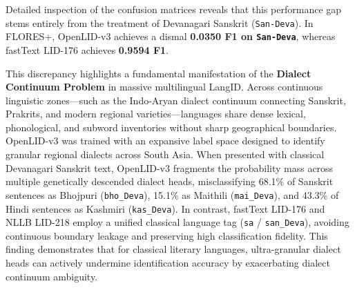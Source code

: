 \documentclass[11pt]{article}
\begin{document}
Detailed inspection of the confusion matrices reveals that this performance gap stems entirely from the treatment of Devanagari Sanskrit (\texttt{San-Deva}). In FLORES+, OpenLID-v3 achieves a dismal \textbf{0.0350 F1 on \texttt{San-Deva}}, whereas fastText LID-176 achieves \textbf{0.9594 F1}.

This discrepancy highlights a fundamental manifestation of the \textbf{Dialect Continuum Problem} in massive multilingual LangID. Across continuous linguistic zones—such as the Indo-Aryan dialect continuum connecting Sanskrit, Prakrits, and modern regional varieties—languages share dense lexical, phonological, and subword inventories without sharp geographical boundaries. OpenLID-v3 was trained with an expansive label space designed to identify granular regional dialects across South Asia. When presented with classical Devanagari Sanskrit text, OpenLID-v3 fragments the probability mass across multiple genetically descended dialect heads, misclassifying 68.1\% of Sanskrit sentences as Bhojpuri (\texttt{bho\_Deva}), 15.1\% as Maithili (\texttt{mai\_Deva}), and 43.3\% of Hindi sentences as Kashmiri (\texttt{kas\_Deva}). In contrast, fastText LID-176 and NLLB LID-218 employ a unified classical language tag (\texttt{sa} / \texttt{san\_Deva}), avoiding continuous boundary leakage and preserving high classification fidelity. This finding demonstrates that for classical literary languages, ultra-granular dialect heads can actively undermine identification accuracy by exacerbating dialect continuum ambiguity.
\end{document}

